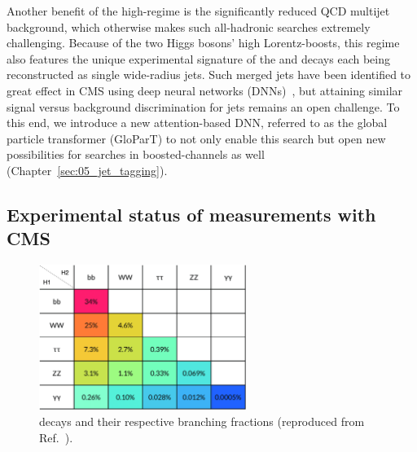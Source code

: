 Another benefit of the high-\mHH regime is the significantly reduced QCD multijet background, which otherwise makes such all-hadronic searches extremely challenging.
Because of the two Higgs bosons' high Lorentz-boosts, this regime also features the unique experimental signature of the \bbbar and \VVq decays each being reconstructed as single wide-radius jets.
Such merged \hbb jets have been identified to great effect in CMS using deep neural networks (DNNs)~\cite{CMS:2023tlv, CMS:2022gjd}, but attaining similar signal versus background discrimination for \hvv jets remains an open challenge.
To this end, we introduce a new attention-based DNN, referred to as the global particle transformer (GloParT) to not only enable this search but open new possibilities for searches in boosted-\VV channels as well (Chapter~\ref{sec:05_jet_tagging}).

\subsection{Experimental status of \HH measurements with CMS}
\label{sec:05_smhh_golden_channels}

\begin{figure}[ht]
    \centering
    \includegraphics[width=0.6\textwidth]{figures/05-HH/CMS-results/HHBRs.png}
    \caption{\HH decays and their respective branching fractions (reproduced from Ref.~\cite{Veatch:2022uzz}).}
    \label{fig:05_hhbrs}
\end{figure}

